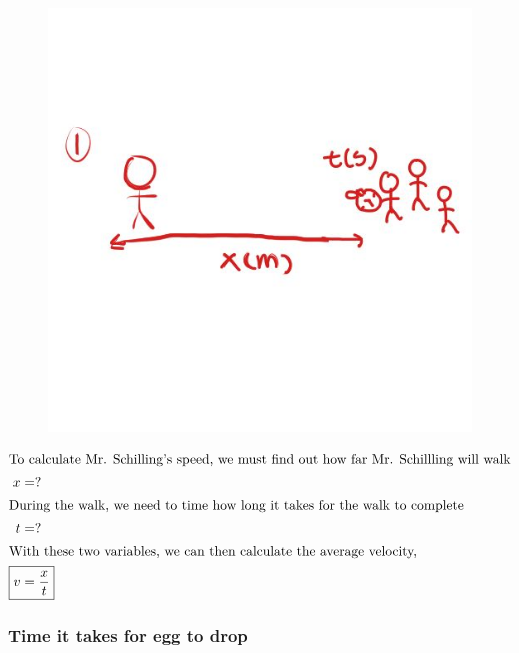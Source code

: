 \documentclass[12pt]{article}
\begin{document}
\begin{figure}[H]
	\begin{center}
		\includegraphics[scale=2]{1.JPEG}
	\end{center}
\end{figure}

\begin{align*}
	\intertext{To calculate Mr. Schilling's speed, we must find out how far Mr. Schillling will walk}
	x         & =?            \\
	\intertext{During the walk, we need to time how long it takes for the walk to complete}
	t         & =?            \\
	\intertext{With these two variables, we can then calculate the average velocity,}
	\Aboxed{v & =\frac{x}{t}}
\end{align*}

\subsubsection{Time it takes for egg to drop}
\end{document}
